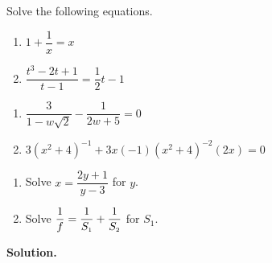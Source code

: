 \documentclass{ximera}
\begin{document}
\pagebreak

\begin{example}\label{rateqnreviewex} Solve the following equations.

\begin{multicols}{2}
\begin{enumerate}

\item  $1 + \dfrac{1}{x} = x$

\item  $\dfrac{t^3-2t+1}{t-1} = \dfrac{1}{2}t-1$



\setcounter{HW}{\value{enumi}}
\end{enumerate}

\end{multicols}

\begin{multicols}{2}
\begin{enumerate}
\setcounter{enumi}{\value{HW}}


\item  $\dfrac{3}{1 - w\sqrt{2}} - \dfrac{1}{2w+5} = 0$

\item $3(x^2+4)^{-1} + 3x(-1)(x^2+4)^{-2}(2x) = 0$

\setcounter{HW}{\value{enumi}}
\end{enumerate}

\end{multicols}

\begin{multicols}{2}
\begin{enumerate}
\setcounter{enumi}{\value{HW}}

\item  Solve $x = \dfrac{2y+1}{y-3}$ for $y$. 

\item  Solve $\dfrac{1}{f} = \dfrac{1}{S_{\text{\tiny $1$}}} + \dfrac{1}{S_{\text{\tiny $2$}}}$ for $S_{1}$.

\setcounter{HW}{\value{enumi}}
\end{enumerate}

\end{multicols}

{\bf Solution.} 

\begin{enumerate}


\end{enumerate}
\end{example}
\end{document}
